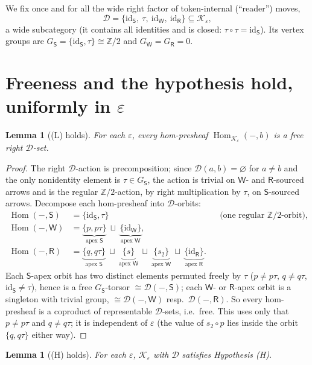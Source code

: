 \documentclass[11pt]{article}
\newtheorem{lemma}[theorem]{Lemma}
\theoremstyle{definition}
\newcommand{\Hom}{\operatorname{Hom}}
\newcommand{\id}{\mathrm{id}}
\newcommand{\D}{\mathcal{D}}
\newcommand{\K}{\mathcal{K}}
\newcommand{\Sup}{\mathsf{S}}
\newcommand{\Wk}{\mathsf{W}}
\newcommand{\Rt}{\mathsf{R}}
\begin{document}
We fix once and for all the wide right factor of token-internal (``reader'') moves,
\[
   \D=\{\id_\Sup,\ \tau,\ \id_\Wk,\ \id_\Rt\}\subseteq\K_\varepsilon,
\]
a wide subcategory (it contains all identities and is closed:
$\tau\circ\tau=\id_\Sup$). Its vertex groups are $G_\Sup=\{\id_\Sup,\tau\}\cong
\mathbb Z/2$ and $G_\Wk=G_\Rt=0$.

\section{Freeness and the hypothesis hold, uniformly in $\varepsilon$}\label{sec:LH}

\begin{lemma}[(L) holds]\label{lem:L}
For each $\varepsilon$, every hom-presheaf $\Hom_{\K_\varepsilon}(-,b)$ is a free
right $\D$-set.
\end{lemma}

\begin{proof}
The right $\D$-action is precomposition; since $\D(a,b)=\varnothing$ for $a\neq b$
and the only nonidentity element is $\tau\in G_\Sup$, the action is trivial on
$\Wk$- and $\Rt$-sourced arrows and is the regular $\mathbb Z/2$-action, by right
multiplication by $\tau$, on $\Sup$-sourced arrows. Decompose each hom-presheaf into
$\D$-orbits:
\[
\begin{aligned}
\Hom(-,\Sup)&=\{\id_\Sup,\tau\} &&\text{(one regular }\mathbb Z/2\text{-orbit)},\\
\Hom(-,\Wk)&=\underbrace{\{p,p\tau\}}_{\text{apex }\Sup}\ \sqcup\ \underbrace{\{\id_\Wk\}}_{\text{apex }\Wk},\\
\Hom(-,\Rt)&=\underbrace{\{q,q\tau\}}_{\text{apex }\Sup}\ \sqcup\ \underbrace{\{s\}}_{\text{apex }\Wk}\ \sqcup\ \underbrace{\{s_2\}}_{\text{apex }\Wk}\ \sqcup\ \underbrace{\{\id_\Rt\}}_{\text{apex }\Rt}.
\end{aligned}
\]
Each $\Sup$-apex orbit has two distinct elements permuted freely by $\tau$
($p\neq p\tau$, $q\neq q\tau$, $\id_\Sup\neq\tau$), hence is a free
$G_\Sup$-torsor $\cong\D(-,\Sup)$; each $\Wk$- or $\Rt$-apex orbit is a singleton
with trivial group, $\cong\D(-,\Wk)$ resp.\ $\D(-,\Rt)$. So every hom-presheaf is a
coproduct of representable $\D$-sets, i.e.\ free. This uses only that $p\neq p\tau$
and $q\neq q\tau$; it is independent of $\varepsilon$ (the value of $s_2\circ p$
lies inside the orbit $\{q,q\tau\}$ either way).
\end{proof}

\begin{lemma}[(H) holds]\label{lem:H}
For each $\varepsilon$, $\K_\varepsilon$ with $\D$ satisfies Hypothesis (H).
\end{lemma}
\end{document}
